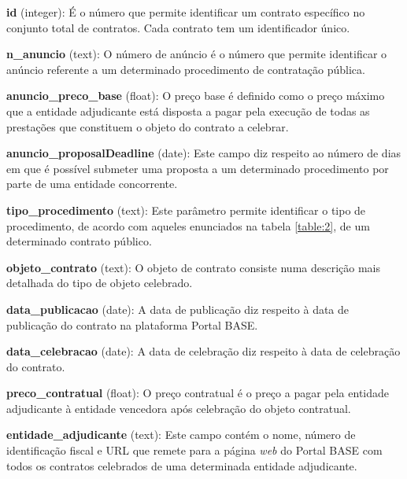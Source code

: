 \begin{my_itemize}
	
\item \textbf{id} (integer): É o número que permite identificar um contrato específico no conjunto total de contratos. Cada contrato tem um identificador único.

\item \textbf{n\_anuncio} (text): O número de anúncio é o número que permite identificar o anúncio referente a um determinado procedimento de contratação pública.


\item \textbf{anuncio\_preco\_base} (float): O preço base é definido como o preço máximo que a entidade adjudicante está disposta a pagar pela execução de todas as prestações que constituem o objeto do contrato a celebrar.

\item \textbf{anuncio\_proposalDeadline} (date): Este campo diz respeito ao número de dias em que é possível submeter uma proposta a um determinado procedimento por parte de uma entidade concorrente. 

\item \textbf{tipo\_procedimento} (text): Este parâmetro permite identificar o tipo de procedimento, de acordo com aqueles enunciados na tabela \ref{table:2}, de um  determinado contrato público.

\item \textbf{objeto\_contrato} (text): O objeto de contrato consiste numa descrição mais detalhada do tipo de objeto celebrado. 

\item \textbf{data\_publicacao} (date): A data de publicação diz respeito à data de publicação do contrato na plataforma Portal BASE.

\item \textbf{data\_celebracao} (date): A data de celebração diz respeito à data de celebração do contrato. 

\item \textbf{preco\_contratual} (float): O  preço contratual é o preço a pagar pela entidade adjudicante à entidade vencedora após celebração do objeto contratual. 

\item \textbf{entidade\_adjudicante} (text): Este campo contém o nome, número de identificação fiscal e URL que remete para a página \textit{web} do Portal BASE com todos os contratos celebrados de uma determinada entidade adjudicante. 


\end{my_itemize}
